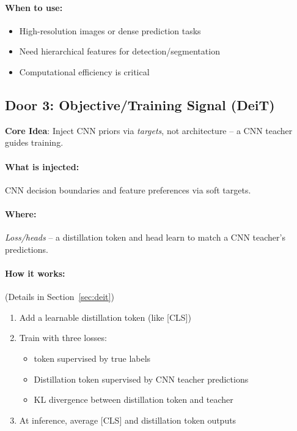 \documentclass{article}
\begin{document}
\paragraph{When to use:}
\begin{itemize}
\item High-resolution images or dense prediction tasks
\item Need hierarchical features for detection/segmentation
\item Computational efficiency is critical
\end{itemize}

\subsection{Door 3: Objective/Training Signal (DeiT)}

\textbf{Core Idea}: Inject CNN priors via \textit{targets}, not architecture -- a CNN teacher guides training.

\paragraph{What is injected:} CNN decision boundaries and feature preferences via soft targets.

\paragraph{Where:} \textit{Loss/heads} -- a distillation token and head learn to match a CNN teacher's predictions.

\paragraph{How it works:} (Details in Section~\ref{sec:deit})
\begin{enumerate}
\item Add a learnable distillation token (like [CLS])
\item Train with three losses:
    \begin{itemize}
    \item [CLS] token supervised by true labels
    \item Distillation token supervised by CNN teacher predictions
    \item KL divergence between distillation token and teacher
    \end{itemize}
\item At inference, average [CLS] and distillation token outputs
\end{enumerate}
\end{document}
